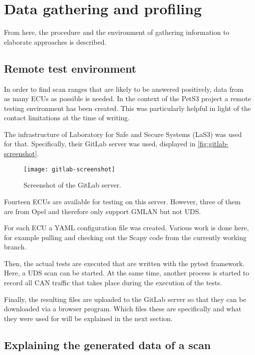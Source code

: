 \section{Data gathering and profiling}
\label{sec:data-gathering}

From here, the procedure and the environment of gathering information to elaborate approaches is described.

\subsection{Remote test environment}

In order to find scan ranges that are likely to be answered positively, data from as many ECUs as possible is needed. In the context of the PetS3 project a remote testing environment has been created. This was particularly helpful in light of the contact limitations at the time of writing.

The infrastructure of Laboratory for Safe and Secure Systems (LaS3) was used for that. Specifically, their GitLab server was used, displayed in \autoref{fig:gitlab-screenshot}.

\begin{figure}[h]
    \centering
    \texttt{[image: gitlab-screenshot]}
    \caption{Screenshot of the GitLab server.}
    \label{fig:gitlab-screenshot}
\end{figure}

Fourteen ECUs are available for testing on this server. However, three of them are from Opel and therefore only support GMLAN but not UDS.

For each ECU a YAML configuration file was created. Various work is done here, for example pulling and checking out the Scapy code from the currently working branch.

Then, the actual tests are executed that are written with the pytest framework. Here, a UDS scan can be started. At the same time, another process is started to record all CAN traffic that takes place during the execution of the tests.

Finally, the resulting files are uploaded to the GitLab server so that they can be downloaded via a browser program. Which files these are specifically and what they were used for will be explained in the next section.

\subsection{Explaining the generated data of a scan}

